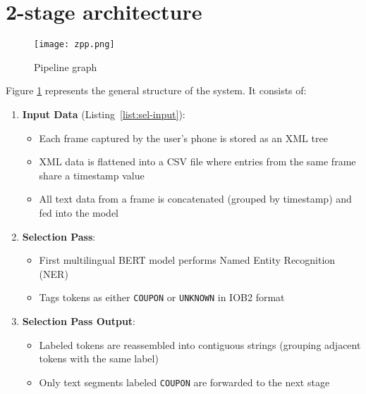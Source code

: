 \documentclass[licencjacka,en]{pracamgr}
\begin{document}
\section{2-stage architecture}
\begin{figure}
    \centering
    \texttt{[image: zpp.png]}
    \caption{Pipeline graph}
    \label{fig:zpp}
\end{figure}
Figure \ref{fig:zpp} represents the general structure of the system. It consists of:
\begin{enumerate}
    \item \textbf{Input Data} (Listing~\ref{list:sel-input}):
    \begin{itemize}
        \item Each frame captured by the user's phone is stored as an XML tree
        \item XML data is flattened into a CSV file where entries from the same frame share a timestamp value
        \item All text data from a frame is concatenated (grouped by timestamp) and fed into the model
    \end{itemize}

    \item \textbf{Selection Pass}:
    \begin{itemize}
        \item First multilingual BERT model performs Named Entity Recognition (NER)
        \item Tags tokens as either \texttt{COUPON} or \texttt{UNKNOWN} in IOB2 format~\cite{iob2}
    \end{itemize}

    \item \textbf{Selection Pass Output}:
    \begin{itemize}
        \item Labeled tokens are reassembled into contiguous strings (grouping adjacent tokens with the same label)
        \item Only text segments labeled \texttt{COUPON} are forwarded to the next stage
    \end{itemize}


\end{enumerate}
\end{document}
